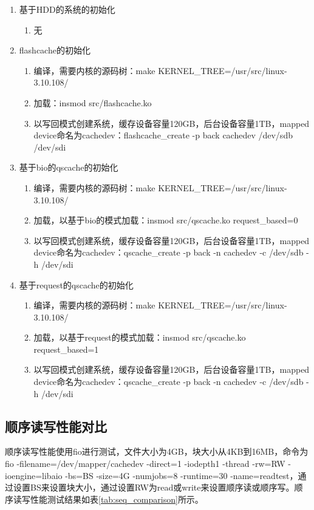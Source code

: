 \begin{enumerate}
    \item 基于HDD的系统的初始化
          \begin{enumerate}
              \item 无
          \end{enumerate}
    \item flashcache的初始化
    \begin{enumerate}
        \item 编译，需要内核的源码树：make KERNEL\_TREE=/usr/src/linux-3.10.108/
        \item 加载：insmod src/flashcache.ko
        \item 以写回模式创建系统，缓存设备容量120GB，后台设备容量1TB，mapped device命名为cachedev：flashcache\_create -p back cachedev /dev/sdb /dev/sdi
    \end{enumerate}
    \item 基于bio的qscache的初始化
    \begin{enumerate}
        \item 编译，需要内核的源码树：make KERNEL\_TREE=/usr/src/linux-3.10.108/
        \item 加载，以基于bio的模式加载：insmod src/qscache.ko request\_based=0
        \item 以写回模式创建系统，缓存设备容量120GB，后台设备容量1TB，mapped device命名为cachedev：qscache\_create -p back -n cachedev -c /dev/sdb -h /dev/sdi
    \end{enumerate}
    \item 基于request的qscache的初始化
    \begin{enumerate}
        \item 编译，需要内核的源码树：make KERNEL\_TREE=/usr/src/linux-3.10.108/
        \item 加载，以基于request的模式加载：insmod src/qscache.ko request\_based=1
        \item 以写回模式创建系统，缓存设备容量120GB，后台设备容量1TB，mapped device命名为cachedev：qscache\_create -p back -n cachedev -c /dev/sdb -h /dev/sdi
    \end{enumerate}
\end{enumerate}

\subsection{顺序读写性能对比}

顺序读写性能使用fio进行测试，文件大小为4GB，块大小从4KB到16MB，命令为fio -filename=/dev/mapper/cachedev -direct=1 -iodepth1 -thread -rw=RW -ioengine=libaio -bs=BS -size=4G -numjobs=8 -runtime=30 -name=readtest，通过设置BS来设置块大小，通过设置RW为read或write来设置顺序读或顺序写。顺序读写性能测试结果如表\ref{tab:seq_comparison}所示。

